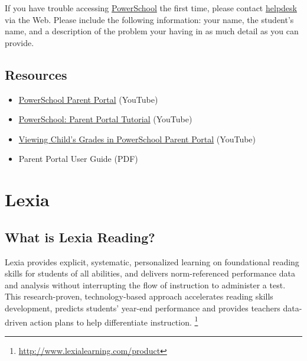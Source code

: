 \documentclass[letterpaper,10pt,english]{sphinxmanual}
\begin{document}
If you have trouble accessing \href{http://chelseaschool.powerschool.com/}{PowerSchool} the first time, please contact \href{http://chelseapride.org/helpdesk}{helpdesk} via the Web. Please include the following information: your name, the student's name, and a description of the problem your having in as much detail as you can provide.


\section{Resources}
\label{powerschool:resources}\begin{itemize}
\item {} 
\href{http://youtu.be/SzF4wF4fglY}{PowerSchool Parent Portal} (YouTube)

\item {} 
\href{http://youtu.be/7z5rOk-89OE}{PowerSchool: Parent Portal Tutorial} (YouTube)

\item {} 
\href{http://youtu.be/YFS0n2D8ri4}{Viewing Child's Grades in PowerSchool Parent Portal} (YouTube)

\item {} 
Parent Portal User Guide (PDF)

\end{itemize}


\chapter{Lexia}
\label{lexia::doc}\label{lexia:index-0}\label{lexia:lexia}

\section{What is Lexia Reading?}
\label{lexia:what-is-lexia-reading}
Lexia provides explicit, systematic, personalized learning on foundational reading skills for students of all abilities, and delivers norm-referenced performance data and analysis without interrupting the flow of instruction to administer a test. This research-proven, technology-based approach accelerates reading skills development, predicts students’ year-end performance and provides teachers data-driven action plans to help differentiate instruction. \footnote{
\href{http://www.lexialearning.com/product}{http://www.lexialearning.com/product}
}
\end{document}
